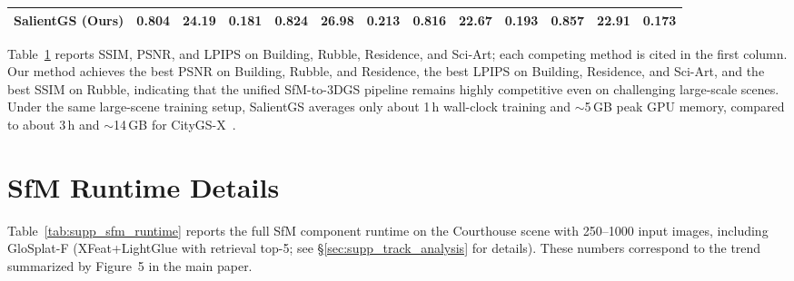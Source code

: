 \documentclass[sigconf]{acmart}
\begin{document}
\begin{table}[t]
{\begin{tabular}{lcccccccccccc}
        \midrule
        SalientGS (Ours)
            & \cellcolor{tabsecond}0.804 & \cellcolor{tabfirst}\bf 24.19 & \cellcolor{tabfirst}\bf 0.181
            & \cellcolor{tabfirst}\bf 0.824 & \cellcolor{tabfirst}\bf 26.98 & \cellcolor{tabthird}0.213
            & \cellcolor{tabthird}0.816 & \cellcolor{tabfirst}\bf 22.67 & \cellcolor{tabfirst}\bf 0.193
            & \cellcolor{tabsecond}0.857 & 22.91 & \cellcolor{tabfirst}\bf 0.173 \\
        \bottomrule
    \end{tabular}%
    }
    \label{tab:supp_large_scene}
\end{table}

Table~\ref{tab:supp_large_scene} reports SSIM, PSNR, and LPIPS on Building, Rubble, Residence, and Sci-Art; each competing method is cited in the first column. Our method achieves the best PSNR on Building, Rubble, and Residence, the best LPIPS on Building, Residence, and Sci-Art, and the best SSIM on Rubble, indicating that the unified SfM-to-3DGS pipeline remains highly competitive even on challenging large-scale scenes.
Under the same large-scene training setup, SalientGS averages only about 1\,h wall-clock training and $\sim$5\,GB peak GPU memory, compared to about 3\,h and $\sim$14\,GB for CityGS-X~\cite{gao2025citygsx}.

\section{SfM Runtime Details}
\label{sec:supp_runtime}

Table~\ref{tab:supp_sfm_runtime} reports the full SfM component runtime on the Courthouse scene with 250--1000 input images, including GloSplat-F (XFeat+LightGlue with retrieval top-5; see \S\ref{sec:supp_track_analysis} for details). These numbers correspond to the trend summarized by Figure~5 in the main paper.
\end{document}
